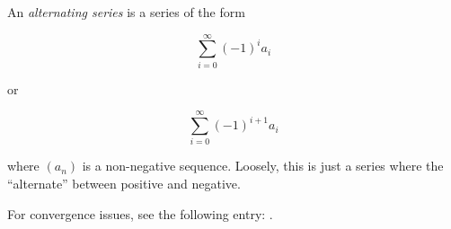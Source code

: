 \documentclass[12pt]{article}
\begin{document}
An \emph{alternating series} is a series of the form

$$\sum_{i = 0}^{\infty}(-1)^ia_i$$

or

$$\sum_{i = 0}^{\infty}(-1)^{i+1}a_i$$

where $(a_n)$ is a non-negative sequence.  Loosely, this is just a series where the  ``alternate'' between positive and negative.

For convergence issues, see the following entry:  .
\end{document}
